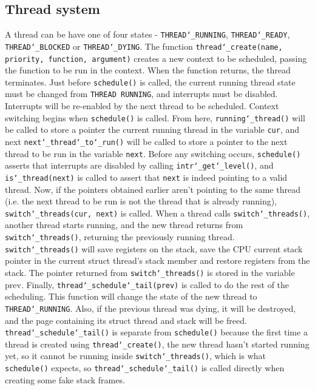 \documentclass{article}
\renewcommand{\_}{\char`_}
\begin{document}
\subsection{Thread system}
A thread can be have one of four states - \texttt{THREAD\_RUNNING}, \texttt{THREAD\_READY}, \texttt{THREAD\_BLOCKED} or \texttt{THREAD\_DYING}. The function \texttt{thread\_create(name, priority, function, argument)} creates a new context to be scheduled, 
passing the function to be run in the context. When the function returns, the thread terminates. 
Just before \texttt{schedule()} is called, the current running thread state must be changed from 
\texttt{THREAD RUNNING}, and interrupts must be disabled. Interrupts will be re-enabled by the next 
thread to be scheduled. Context switching begins when \texttt{schedule()} is called. From here, 
\texttt{running\_thread()} will be called to store a pointer the current running thread in the variable \texttt{cur}, 
and next \texttt{next\_thread\_to\_run()} will be called to store a pointer to the next thread to be run in the
variable \texttt{next}. Before any switching occurs, \texttt{schedule()} asserts that interrupts are disabled by calling 
\texttt{intr\_get\_level()}, and \texttt{is\_thread(next)} is called to assert that \texttt{next} is indeed pointing to a valid thread. 
Now, if the pointers obtained earlier aren’t pointing to the same thread (i.e. the next thread to be run 
is not the thread that is already running), \texttt{switch\_threads(cur, next)} is called. When a thread calls 
\texttt{switch\_threads()}, another thread starts running, and the new thread returns from \texttt{switch\_threads()}, 
returning the previously running thread. \texttt{switch\_threads()} will save registers on the stack, save 
the CPU current stack pointer in the current struct thread’s stack member and restore registers 
from the stack. The pointer returned from \texttt{switch\_threads()} is stored in the variable prev. Finally, 
\texttt{thread\_schedule\_tail(prev)} is called to do the rest of the scheduling. This function will change the 
state of the new thread to \texttt{THREAD\_RUNNING}. Also, if the previous thread was dying, it will be 
destroyed, and the page containing its struct thread and stack will be freed. \texttt{thread\_schedule\_tail()}
is separate from \texttt{schedule()} because the first time a thread is created using \texttt{thread\_create()}, the 
new thread hasn't started running yet, so it cannot be running inside \texttt{switch\_threads()}, which is what 
\texttt{schedule()} expects, so \texttt{thread\_schedule\_tail()} is called directly when creating some fake stack frames. 
\end{document}
